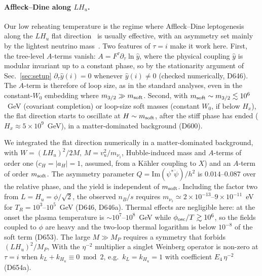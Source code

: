 \documentclass[aps,prd,twocolumn,superscriptaddress,nofootinbib,floatfix]{revtex4-2}
\begin{document}
\paragraph{Affleck--Dine along $LH_u$.} Our low reheating temperature is the regime where Affleck--Dine leptogenesis~\cite{AffleckDine1985,arXiv_hep-ph_9507453} along the $LH_u$ flat direction~\cite{arXiv_hep-ph_9310297} is usually effective, with an asymmetry set mainly by the lightest neutrino mass~\cite{arXiv_hep-ph_0102187,arXiv_hep-ph_0109154}. Two features of $\tau=i$ make it work here. First, the tree-level $A$-terms vanish: $A=F^\tau\partial_\tau\ln\hat y$, where the physical coupling $\hat y$ is modular invariant up to a constant phase, so by the stationarity argument of Sec.~\ref{sec:setup} $\partial_\tau\hat y(i)=0$ whenever $\hat y(i)\neq0$ (checked numerically, D646). The $A$-term is therefore of loop size, as in the standard analyses, even in the constant-$W_0$ embedding where $m_{3/2}\gg m_{\rm soft}$. Second, with $m_{\rm soft}\sim m_{3/2}\lesssim10^6$~GeV (covariant completion) or loop-size soft masses (constant $W_0$, if below $H_x$), the flat direction starts to oscillate at $H\sim m_{\rm soft}$, after the stiff phase has ended ($H_x\approx5\times10^9$~GeV), in a matter-dominated background (D600).

We integrated the flat direction numerically in a matter-dominated background, with $W=(LH_u)^2/2M$, $M=v_u^2/m_{\nu_1}$, Hubble-induced mass and $A$-terms of order one ($c_H=|a_H|=1$, assumed, from a Kähler coupling to $X$) and an $A$-term of order $m_{\rm soft}$. The asymmetry parameter $Q=\mathrm{Im}(\psi^*\dot\psi)/h^2$ is $0.014$--$0.087$ over the relative phase, and the yield is independent of $m_{\rm soft}$. Including the factor two from $L=H_u=\phi/\sqrt2$, the observed $n_B/s$ requires $m_{\nu_1}\simeq2\times10^{-13}$--$9\times10^{-11}$~eV for $T_R=10^3$--$10^5$~GeV (D646, D646a). Thermal effects are negligible here: at the onset the plasma temperature is $\sim10^7$--$10^8$~GeV while $\phi_{\rm osc}/T\gtrsim10^6$, so the fields coupled to $\phi$ are heavy and the two-loop thermal logarithm is below $10^{-8}$ of the soft term (D653). The large $M\gg M_P$ requires a symmetry that forbids $(LH_u)^2/M_P$, With the $\eta^{-2}$ multiplier a singlet Weinberg operator is non-zero at $\tau=i$ when $k_L+k_{H_u}\equiv0\bmod2$, e.g.\ $k_L=k_{H_u}=1$ with coefficient $E_4\,\eta^{-2}$ (D654a).
\end{document}
